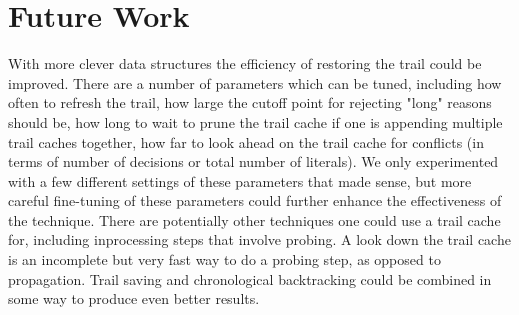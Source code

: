 \documentclass{article}
\begin{document}
\section{Future Work}

With more clever data structures the efficiency of restoring the trail could be improved. There are a number of parameters which can be tuned, including how often to refresh the trail, how large the cutoff point for rejecting "long" reasons should be, how long to wait to prune the trail cache if one is appending multiple trail caches together, how far to look ahead on the trail cache for conflicts (in terms of number of decisions or total number of literals). We only experimented with a few different settings of these parameters that made sense, but more careful fine-tuning of these parameters could further enhance the effectiveness of the technique. There are potentially other techniques one could use a trail cache for, including inprocessing steps that involve probing. A look down the trail cache is an incomplete but very fast way to do a probing step, as opposed to propagation. Trail saving and chronological backtracking could be combined in some way to produce even better results.
{}

\end{document}
